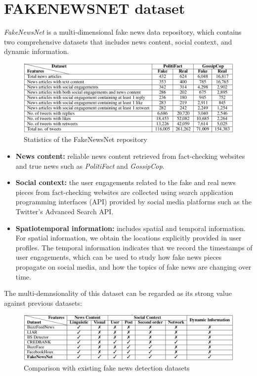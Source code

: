 \documentclass[10pt, english]{report}
\begin{document}
\section{FAKENEWSNET dataset \cite{shu2018fakenewsnet}}
\textit{FakeNewsNet} is a multi-dimensional fake news data repository, which contains two comprehensive datasets that includes news content, social context, and dynamic information.

\begin{figure}[H]
	\centering
	\includegraphics[scale=0.43]{img/fake_news_net_stats.png}
	\caption{Statistics of the FakeNewsNet repository \cite{shu2018fakenewsnet}}
\end{figure}

\begin{itemize}
\item \textbf{News content:} reliable news content retrieved from fact-checking websites and true news such as \textit{PolitiFact} and \textit{GossipCop}.
\item \textbf{Social context:} the user engagements related to the fake and real news pieces from fact-checking websites are collected using search application programming interfaces (API) provided by social media platforms such as the Twitter's Advanced Search API.
\item \textbf{Spatiotemporal information:} includes spatial and temporal information. For spatial information, we obtain the locations explicitly provided in user profiles. The temporal information indicates that we record the timestamps of user engagements, which can be used to study how fake news pieces propagate on social media, and how the topics of fake news are changing over time.
\end{itemize}

The multi-demnsionality of this dataset can be regarded as its strong value against previous datasets:

\begin{figure}[H]
	\centering
	\includegraphics[scale=0.43]{img/fake_news_net_comparison.png}
	\caption{Comparison with existing fake news detection datasets \cite{shu2018fakenewsnet}}
\end{figure}
\end{document}

